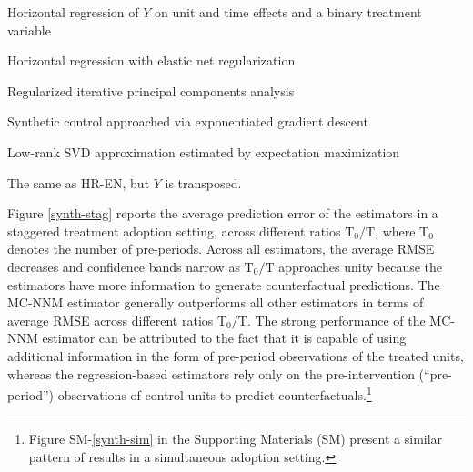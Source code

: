 \documentclass[hidelinks,12pt]{article}
\begin{document}
\begin{description}
	{\setlength\itemindent{1mm}
		\item[DID] Horizontal regression of $Y$ on unit and time effects and a binary treatment variable \citep{athey2017matrix}
		\item[HR-EN] Horizontal regression with elastic net regularization \citep{athey2017matrix} 
		\item[PCA] Regularized iterative principal components analysis \citep{ilin2010practical}
		\item[SC-ADH] Synthetic control approached via exponentiated gradient descent \citep{abadie2010synthetic}
		\item[SVD] Low-rank SVD approximation estimated by expectation maximization \citep{troyanskaya2001missing}
		\item[VT-EN] The same as HR-EN, but $Y$ is transposed.
	}
\end{description}

Figure \ref{synth-stag} reports the average prediction error of the estimators in a staggered treatment adoption setting, across different ratios $\text{T}_0/\text{T}$, where $\text{T}_0$ denotes the number of pre-periods. Across all estimators, the average RMSE decreases and confidence bands narrow as $\text{T}_0/\text{T}$ approaches unity because the estimators have more information to generate counterfactual predictions. The MC-NNM estimator generally outperforms all other estimators in terms of average RMSE across different ratios $\text{T}_0/\text{T}$.  The strong performance of the MC-NNM estimator can be attributed to the fact that it is capable of using additional information in the form of pre-period observations of the treated units, whereas the regression-based estimators rely only on the pre-intervention (``pre-period'') observations of control units to predict counterfactuals.\footnote{Figure SM-\ref{synth-sim} in the Supporting Materials (SM) present a similar pattern of results in a simultaneous adoption setting.}
\end{document}
